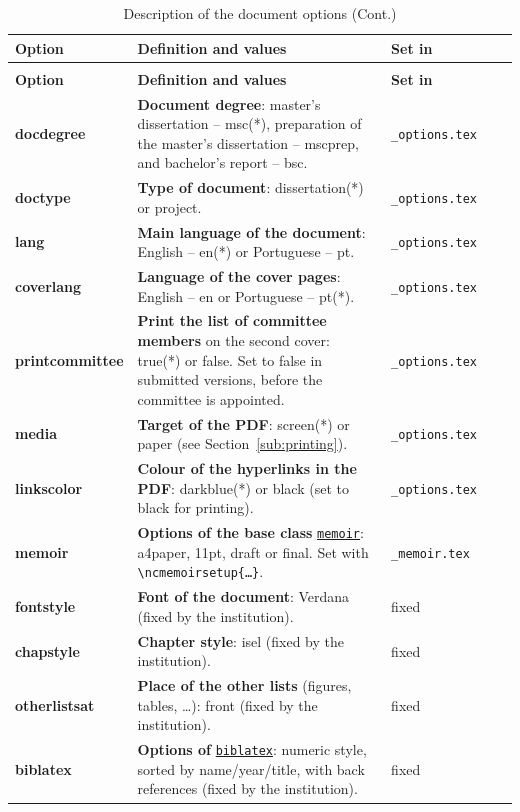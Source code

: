 \begin{xltabular}{\linewidth}{ >{\bfseries}l X l }
\caption{Description of the document options}
\label{tab:vardescription} \\
    \toprule
\textbf{Option} & \textbf{Definition and values} & \textbf{Set in} \\
    \midrule
\endfirsthead
\caption[]{Description of the document options (Cont.)} \\
    \toprule
\textbf{Option} & \textbf{Definition and values} & \textbf{Set in} \\
    \midrule
\endhead
\endfoot
    \bottomrule
\endlastfoot
docdegree   & \textbf{Document degree}: master's dissertation -- msc(*), preparation of the master's dissertation -- mscprep, and bachelor's report -- bsc. & \texttt{\_options.tex} \\ \midrule
doctype & \textbf{Type of document}: dissertation(*) or project. & \texttt{\_options.tex} \\ \midrule
lang    & \textbf{Main language of the document}: English -- en(*) or Portuguese -- pt. & \texttt{\_options.tex} \\ \midrule
coverlang   & \textbf{Language of the cover pages}: English -- en or Portuguese -- pt(*). & \texttt{\_options.tex} \\ \midrule
printcommittee & \textbf{Print the list of committee members} on the second cover: true(*) or false. Set to false in submitted versions, before the committee is appointed. & \texttt{\_options.tex} \\ \midrule
media  & \textbf{Target of the PDF}: screen(*) or paper (see Section~\ref{sub:printing}). & \texttt{\_options.tex} \\ \midrule
linkscolor & \textbf{Colour of the hyperlinks in the PDF}: darkblue(*) or black (set to black for printing). & \texttt{\_options.tex} \\ \midrule
memoir  & \textbf{Options of the base class} \href{https://ctan.org/pkg/memoir}{\texttt{memoir}}: a4paper, 11pt, draft or final. Set with \texttt{\textbackslash ncmemoirsetup\{\ldots\}}. & \texttt{\_memoir.tex} \\ \midrule
fontstyle & \textbf{Font of the document}: Verdana (fixed by the institution). & fixed \\ \midrule
chapstyle   & \textbf{Chapter style}: isel (fixed by the institution). & fixed \\ \midrule
otherlistsat & \textbf{Place of the other lists} (figures, tables, \ldots): front (fixed by the institution). & fixed \\ \midrule
biblatex  & \textbf{Options of} \href{https://ctan.org/pkg/biblatex}{\texttt{biblatex}}: numeric style, sorted by name/year/title, with back references (fixed by the institution). & fixed \\
\end{xltabular}

